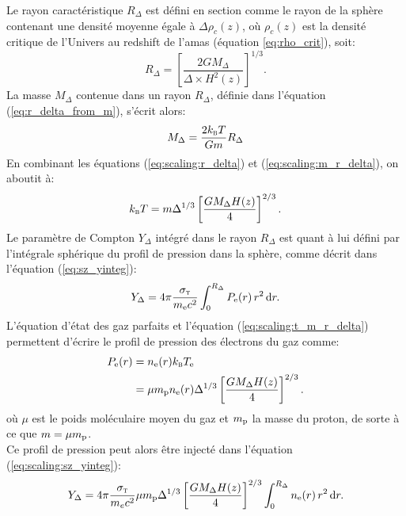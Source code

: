 Le rayon caractéristique $R_\Delta$ est défini en section  comme le rayon de la sphère contenant une densité moyenne égale à $\Delta \rho_c(z)$, où $\rho_c(z)$ est la densité critique de l'Univers au redshift de l'amas (équation \ref{eq:rho_crit}), soit:
\begin{equation}
    \label{eq:scaling:r_delta}
    R_\Delta = \left[ \frac{2GM_\Delta}{\Delta \times H^2(z)} \right]^{1/3}.
\end{equation}
La masse $M_\Delta$ contenue dans un rayon $R_\Delta$, définie dans l'équation (\ref{eq:r_delta_from_m}), s'écrit alors:
\begin{equation}
    \label{eq:scaling:m_r_delta}
    M_\Delta = \frac{2 k_\textsc{b} T}{Gm} R_\Delta
\end{equation}
En combinant les équations (\ref{eq:scaling:r_delta}) et (\ref{eq:scaling:m_r_delta}), on aboutit à:
\begin{equation}
    \label{eq:scaling:t_m_r_delta}
    k_\textsc{b} T = m \Delta^{1/3} \left[\frac{G M_\Delta H(z)}{4}\right]^{2/3}.
\end{equation}
Le paramètre de Compton $Y_\Delta$ intégré dans le rayon $R_\Delta$ est quant à lui défini par l'intégrale sphérique du profil de pression dans la sphère, comme décrit dans l'équation (\ref{eq:sz_yinteg}):
\begin{equation}
    \label{eq:scaling:sz_yinteg}
    Y_\Delta = 4\pi \frac{\sigma_\textsc{t}}{m_{\rm e} c^2} \int_0^{R_\Delta} P_{\rm e}(r) \, r^2 \, \mathrm{d} r.
\end{equation}
L'équation d'état des gaz parfaits et l'équation (\ref{eq:scaling:t_m_r_delta}) permettent d'écrire le profil de pression des électrons du gaz comme:
\begin{align}
    \nonumber P_{\rm e}(r) &= n_{\rm e}(r) k_\textsc{b} T_{\rm e} \\
              &= \mu m_{\rm p} n_{\rm e}(r) \Delta^{1/3} \left[\frac{G M_\Delta H(z)}{4}\right]^{2/3}.
\end{align}
où $\mu$ est le poids moléculaire moyen du gaz et $m_{\rm p}$ la masse du proton, de sorte à ce que $m = \mu m_{\rm p}$. \\
Ce profil de pression peut alors être injecté dans l'équation (\ref{eq:scaling:sz_yinteg}):
\begin{equation}
    Y_\Delta = 4\pi \frac{\sigma_\textsc{t}}{m_e c^2} \mu m_{\rm p} \Delta^{1/3} \left[\frac{G M_\Delta H(z)}{4}\right]^{2/3} \int_0^{R_\Delta} n_{\rm e}(r) \, r^2 \, \mathrm{d} r.
\end{equation}
